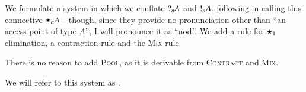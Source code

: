 \documentclass[10pt,a4paper,twocolumn,notitlepage]{article}
\begin{document}
We formulate a system in which we conflate $\give[n]{A}$ and $\take[n]{A}$,
following \citet{atkey2016} in calling this connective $\nod[n]{A}$---though,
since they provide no pronunciation other than ``an access point of type $A$'',
I will pronounce it as ``nod''.
We add a rule for $\nod[1]{}$ elimination, a contraction rule and the
\textsc{Mix} rule.
\begin{center}
  \begin{proofbox}
    \SYM{\nod{}}
  \end{proofbox}
  \begin{proofbox}
  \end{proofbox}
\end{center}
There is no reason to add \textsc{Pool}, as it is derivable from \textsc{Contract}
and \textsc{Mix}.
\begin{proofblock}
\end{proofblock}
We will refer to this system as \ndcp.
\end{document}
